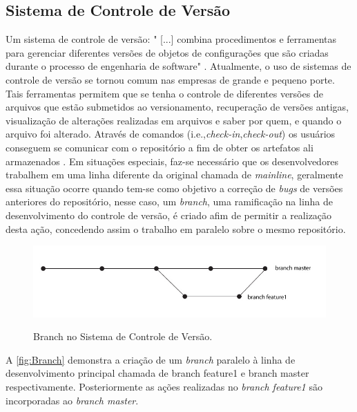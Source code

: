 \subsection{Sistema de Controle de Versão}
Um sistema de controle de versão: "	[...] combina procedimentos e ferramentas para gerenciar diferentes versões de objetos de configurações que são criadas durante o processo de engenharia de software" \cite[p.~927]{pressman2010}.
Atualmente, o uso de sistemas de controle de versão se tornou comum nas empresas de grande e pequeno porte. Tais ferramentas permitem que se tenha o controle de diferentes versões de arquivos que estão submetidos ao versionamento, recuperação de versões antigas, visualização de alterações realizadas em arquivos e saber por quem, e quando o arquivo foi alterado. Através de comandos (i.e.,\textit{check-in},\textit{check-out}) os usuários conseguem se comunicar com o repositório a fim de obter os artefatos ali armazenados \cite{gleiph2011}. Em situações especiais, faz-se necessário que os desenvolvedores trabalhem em uma linha diferente da original chamada de \textit{mainline}, geralmente essa situação ocorre quando tem-se como objetivo a correção de \textit{bugs} de versões anteriores do repositório, nesse caso, um \textit{branch}, uma ramificação na linha de desenvolvimento do controle de versão, é criado afim de permitir a realização desta ação, concedendo assim o trabalho em paralelo sobre o mesmo repositório.
\begin{figure}[h]
\centering
\caption[Branch no Sistema de Controle de Versão]{Branch no Sistema de Controle de Versão.}
\includegraphics[width=0.5\linewidth]{./images/branch}
\label{fig:Branch}
\end{figure}
A \autoref{fig:Branch} demonstra a criação de um \textit{branch} paralelo à linha de desenvolvimento principal chamada de branch feature1 e branch master respectivamente. Posteriormente as ações realizadas no \textit{branch feature1} são incorporadas ao \textit{branch master}.

